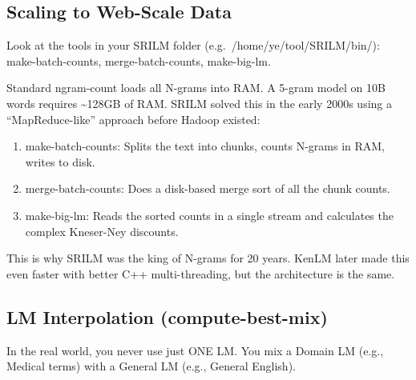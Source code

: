 \documentclass[11pt]{article}
\providecommand{\tightlist}{%
      \setlength{\itemsep}{0pt}\setlength{\parskip}{0pt}}
\begin{document}
\hypertarget{scaling-to-web-scale-data}{%
\subsection{Scaling to Web-Scale Data}\label{scaling-to-web-scale-data}}

Look at the tools in your SRILM folder (e.g.~/home/ye/tool/SRILM/bin/):
make-batch-counts, merge-batch-counts, make-big-lm.

Standard ngram-count loads all N-grams into RAM. A 5-gram model on 10B
words requires \textasciitilde128GB of RAM. SRILM solved this in the
early 2000s using a ``MapReduce-like'' approach before Hadoop existed:

\begin{enumerate}
\def\labelenumi{\arabic{enumi}.}
\tightlist
\item
  make-batch-counts: Splits the text into chunks, counts N-grams in RAM,
  writes to disk.\\
\item
  merge-batch-counts: Does a disk-based merge sort of all the chunk
  counts.\\
\item
  make-big-lm: Reads the sorted counts in a single stream and calculates
  the complex Kneser-Ney discounts.
\end{enumerate}

This is why SRILM was the king of N-grams for 20 years. KenLM later made
this even faster with better C++ multi-threading, but the architecture
is the same.

\hypertarget{lm-interpolation-compute-best-mix}{%
\subsection{LM Interpolation
(compute-best-mix)}\label{lm-interpolation-compute-best-mix}}

In the real world, you never use just ONE LM. You mix a Domain LM (e.g.,
Medical terms) with a General LM (e.g., General English).
\end{document}
